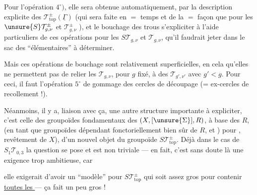 Pour l'opération $4^\circ)$, elle sera obtenue automatiquement, par la description explicite des
$\mathcal T_{\mathrm{top}}^\pm(\underline\Gamma)$
(qui sera faite en $=$ temps et de la $=$ façon que pour les $\unsure{S}\mathcal T_{g,\nu}^\pm$ et $\mathcal T_{g,\nu}^\pm$ ),
et le bouchage des trous  s'expliciter à l'aide   particuliers de ces opérations pour les
$S\mathcal T_{g,\nu}$ et $\mathcal T_{g,\nu}$, qu'il faudrait jeter dans le sac des
  ``élémentaires'' à déterminer.

\deleted{$(**)$}\quad
{}
Mais ces opérations de bouchage sont relativement superficielles, en cela qu'elles ne permettent pas de relier les $\mathcal T_{g,\nu}$, pour $g$ fixé, à des $\mathcal T_{g',\nu'}$ avec $g'<g$. Pour ceci, il faut l'opération \textcircled{$5^\circ$} de gommage des cercles de découpage (= ex-cercles de recollement !).

Néanmoins, il y a,   liaison avec ça, une autre structure importante à expliciter, c'est celle  des groupoïdes fondamentaux  des $(X,[\unsure{\Sigma}],R)$,  à base des $R$, (en tant que groupoïdes dépendant fonctoriellement bien sûr de $R$, et   ) pour    ,   revêtement  de $X$), d'un nouvel objet du  groupoïde $S\mathcal T_{\mathrm{top}}^\pm$. Déjà dans le cas de $S_1\mathcal T_{0,3}$ la question se pose et est non triviale --- en fait, c'est sans doute là une exigence trop ambitieuse, car

elle exigerait d'avoir un ``modèle'' pour $S\mathcal T_{\mathrm{top}}^\pm$ qui soit assez gros pour contenir  \uline{toutes les } --- ça fait un peu gros !

